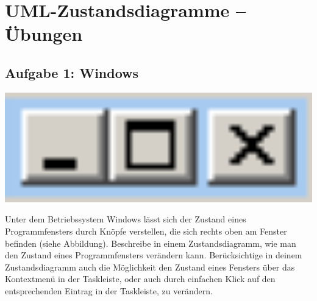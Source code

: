 \clearpage

\rehead[]{\textcolor{lightblue}{AvHG, Inf, My}}
\lohead[]{\textcolor{lightblue}{AvHG, Inf, My}}

\section{UML-Zustandsdiagramme -- Übungen}

\vspace{1mm}

\begin{minipage}{0.9\textwidth}
\subsection{Aufgabe 1: Windows}
\end{minipage}
\begin{minipage}{0.1\textwidth}
\begin{center}
\includegraphics[width=1.0\textwidth]{./inf/SEKII/11_UML_Zustandsdiagramme/windows.png}
\end{center}
\end{minipage}

Unter dem Betriebssystem Windows lässt sich der Zustand eines Programmfensters
durch Knöpfe verstellen, die sich rechts oben am Fenster befinden (siehe
Abbildung). Beschreibe in einem Zustandsdiagramm, wie man den Zustand eines
Programmfensters verändern kann. Berücksichtige in deinem Zustandsdiagramm auch
die Möglichkeit den Zustand eines Fensters über das Kontextmenü in der
Taskleiste, oder auch durch einfachen Klick auf den entsprechenden Eintrag in
der Taskleiste, zu verändern.

